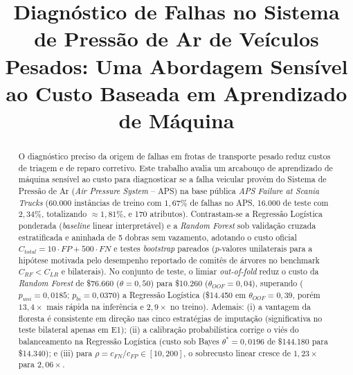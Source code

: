 \documentclass[conference]{IEEEtran}
\begin{document}
\raggedbottom

\title{Diagnóstico de Falhas no Sistema de Pressão de Ar de Veículos Pesados: Uma Abordagem Sensível ao Custo Baseada em Aprendizado de Máquina}

\author{
}

\maketitle

\begin{abstract}
O diagnóstico preciso da origem de falhas em frotas de transporte pesado reduz custos de triagem e de reparo corretivo. Este trabalho avalia um arcabouço de aprendizado de máquina sensível ao custo para diagnosticar se a falha veicular provém do Sistema de Pressão de Ar (\textit{Air Pressure System} -- APS) na base pública \textit{APS Failure at Scania Trucks} (60.000 instâncias de treino com $1{,}67\%$ de falhas no APS, 16.000 de teste com $2{,}34\%$, totalizando $\approx 1{,}81\%$, e 170 atributos). Contrastam-se a Regressão Logística ponderada (\textit{baseline} linear interpretável) e a \textit{Random Forest} sob validação cruzada estratificada e aninhada de 5 dobras sem vazamento, adotando o custo oficial $C_{total} = 10 \cdot FP + 500 \cdot FN$ e testes \textit{bootstrap} pareados ($p$-valores unilaterais para a hipótese motivada pelo desempenho reportado de comitês de árvores no benchmark $C_{RF} < C_{LR}$ e bilaterais). No conjunto de teste, o limiar \textit{out-of-fold} reduz o custo da \textit{Random Forest} de \$76.660 ($\theta=0{,}50$) para \$10.260 ($\theta_{OOF}=0{,}04$), superando ($p_{uni}=0{,}0185$; $p_{bi}=0{,}0370$) a Regressão Logística (\$14.450 em $\theta_{OOF}=0{,}39$, porém $13{,}4\times$ mais rápida na inferência e $2{,}9\times$ no treino). Ademais: (i) a vantagem da floresta é consistente em direção nas cinco estratégias de imputação (significativa no teste bilateral apenas em E1); (ii) a calibração probabilística corrige o viés do balanceamento na Regressão Logística (custo sob Bayes $\theta^*=0{,}0196$ de \$144.180 para \$14.340); e (iii) para $\rho = c_{FN}/c_{FP} \in [10, 200]$, o sobrecusto linear cresce de $1{,}23\times$ para $2{,}06\times$.
\end{abstract}
\end{document}
